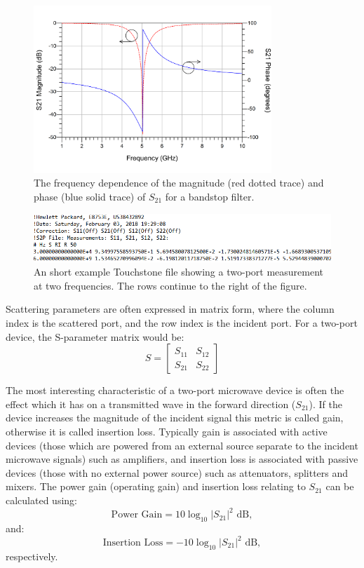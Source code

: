 \documentclass[../thesis/thesis.tex]{subfiles}
\begin{document}
\begin{refsection}
\begin{figure}
	\centering
	\includegraphics[width=0.8\textwidth]{ch2_filter}
	\caption{The frequency dependence of the magnitude (red dotted trace) and phase (blue solid trace) of $S_{21}$ for a bandstop filter.}
	\label{ch2_fig_filter}
\end{figure}

\begin{figure}
	\centering
	\includegraphics[width=\textwidth]{ch2_s2p}
	\caption{An short example Touchstone file showing a two-port measurement at two frequencies. The rows continue to the right of the figure.}
	\label{ch2_fig_s2p}
\end{figure}

Scattering parameters are often expressed in matrix form, where the column index is the scattered port, and the row index is the incident port. For a two-port device, the S-parameter matrix would be:
\begin{equation}
S=
\begin{bmatrix}
S_{11} & S_{12} \\
S_{21} & S_{22}
\end{bmatrix}
\end{equation}

The most interesting characteristic of a two-port microwave device is often the effect which it has on a transmitted wave in the forward direction ($S_{21}$). If the device increases the magnitude of the incident signal this metric is called gain, otherwise it is called insertion loss. Typically gain is associated with active devices (those which are powered from an external source separate to the incident microwave signals) such as amplifiers, and insertion loss is associated with passive devices (those with no external power source) such as attenuators, splitters and mixers. The power gain (operating gain) and insertion loss relating to $S_{21}$ can be calculated using:
\begin{equation}
\textrm{Power Gain} = 10 \log_{10} |S_{21}|^2 \textrm{ dB},
\end{equation}
and:
\begin{equation}
\textrm{Insertion Loss} = -10 \log_{10} |S_{21}|^2 \textrm{ dB},
\end{equation}
respectively.


\end{refsection}
\end{document}
